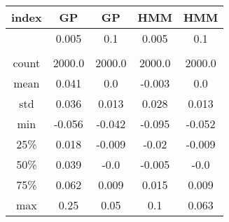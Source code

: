 \centering \begin{tabular}{c|c|c|c|c}
index	&GP	&GP	&HMM	&HMM\\\hline
	&0.005	&0.1	&0.005	&0.1\\
	&	&	&	&\\
count	&2000.0	&2000.0	&2000.0	&2000.0\\
mean	&0.041	&0.0	&-0.003	&0.0\\
std	&0.036	&0.013	&0.028	&0.013\\
min	&-0.056	&-0.042	&-0.095	&-0.052\\
25\%	&0.018	&-0.009	&-0.02	&-0.009\\
50\%	&0.039	&-0.0	&-0.005	&-0.0\\
75\%	&0.062	&0.009	&0.015	&0.009\\
max	&0.25	&0.05	&0.1	&0.063\\
\end{tabular}
